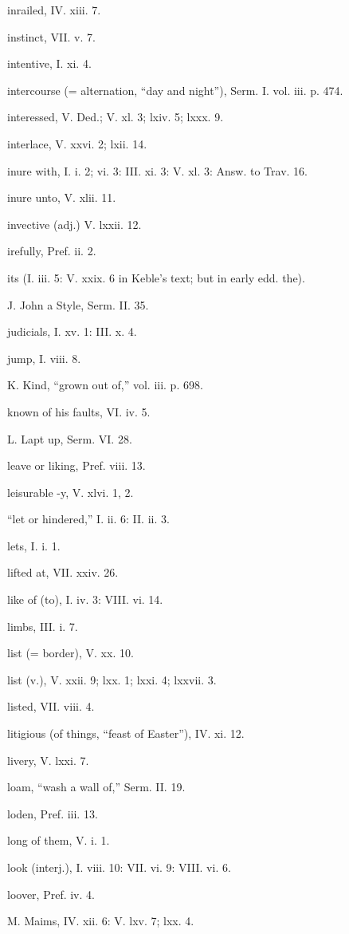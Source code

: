 inrailed, IV. xiii. 7.

instinct, VII. v. 7.

intentive, I. xi. 4.

intercourse (= alternation, “day and night”), Serm. I. vol. iii. p. 474.

interessed, V. Ded.; V. xl. 3; lxiv. 5; lxxx. 9.

interlace, V. xxvi. 2; lxii. 14.

inure with, I. i. 2; vi. 3: III. xi. 3: V. xl. 3: Answ. to Trav. 16.

inure unto, V. xlii. 11.

invective (adj.) V. lxxii. 12.

irefully, Pref. ii. 2.

its (I. iii. 5: V. xxix. 6 in Keble’s text; but in early edd. the).

J.
John a Style, Serm. II. 35.

judicials, I. xv. 1: III. x. 4.

jump, I. viii. 8.

K.
Kind, “grown out of,” vol. iii. p. 698.

known of his faults, VI. iv. 5.

L.
Lapt up, Serm. VI. 28.

leave or liking, Pref. viii. 13.

leisurable -y, V. xlvi. 1, 2.

“let or hindered,” I. ii. 6: II. ii. 3.

lets, I. i. 1.

lifted at, VII. xxiv. 26.

like of (to), I. iv. 3: VIII. vi. 14.

limbs, III. i. 7.

list (= border), V. xx. 10.

list (v.), V. xxii. 9; lxx. 1; lxxi. 4; lxxvii. 3.

listed, VII. viii. 4.

litigious (of things, “feast of Easter”), IV. xi. 12.

livery, V. lxxi. 7.

loam, “wash a wall of,” Serm. II. 19.

loden, Pref. iii. 13.

long of them, V. i. 1.

look (interj.), I. viii. 10: VII. vi. 9: VIII. vi. 6.

loover, Pref. iv. 4.

M.
Maims, IV. xii. 6: V. lxv. 7; lxx. 4.

